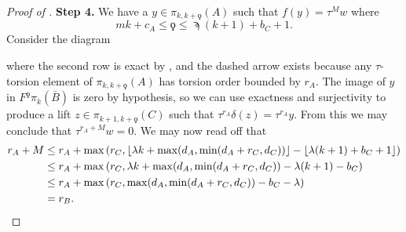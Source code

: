 \begin{proof}[Proof of ]
  {\bf Step 4.} We have a $y \in \pi_{k,k + \qoppa}(A)$ such that $f(y) = \tau^Mw$ where
  $$ mk + c_A \leq \qoppa \leq \sampi (k+1) + b_C + 1. $$
  Consider the diagram
  \begin{center}
  \end{center}
  where the second row is exact by ,
  and the dashed arrow exists because any $\tau$-torsion element of $\pi_{k,k+\qoppa}(A)$ has torsion order bounded by $r_A$. The image of $y$ in $F^\qoppa \pi_k(\bar{B})$ is zero by hypothesis, so we can use exactness and surjectivity to produce a lift $z \in \pi_{k+1,k+\qoppa}(C)$ such that $\tau^{r_A}\delta(z) = \tau^{r_A}y$. From this we may conclude that $\tau^{r_A+M}w = 0$. We may now read off that
  \begin{align*}
    r_A + M
    &\leq r_A + \max \left( r_C, \lfloor \lambda k + \max(d_A, \min(d_A + r_C, d_C)) \rfloor - \lfloor \lambda (k+1) + b_C + 1 \rfloor \right) \\
    &\leq r_A + \max \left( r_C, \lambda k + \max(d_A, \min(d_A + r_C, d_C))  - \lambda (k+1) - b_C  \right) \\
    &\leq r_A + \max \left( r_C, \max(d_A, \min(d_A + r_C, d_C)) - b_C - \lambda \right) \\
    &= r_B. \qedhere
    \end{align*}
\end{proof}

